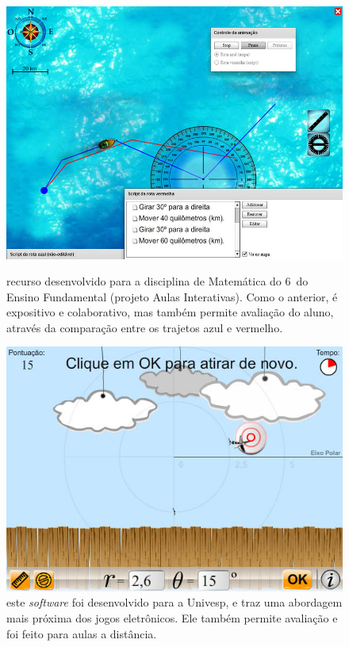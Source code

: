 \documentclass[a4paper,10pt]{scrartcl}					%
\newcommand\foreign[1]{\textsl{#1}}
\begin{document}
	\begin{figure}
		\centering
		\begin{minipage}[b]{0.46\textwidth}
			\includegraphics[width=\textwidth]{images/navigation.jpg}
			\caption{recurso desenvolvido para a disciplina de Matemática do 6\textordmasculine\ do Ensino Fundamental (projeto Aulas Interativas). Como o anterior, é expositivo e colaborativo, mas também permite avaliação do aluno, através da comparação entre os trajetos azul e vermelho.}
			\label{fig:nav}
		\end{minipage}\hfill
		\begin{minipage}[b]{0.46\textwidth}
			\includegraphics[width=\textwidth]{images/polar.jpg}
			\caption{este \foreign{software} foi desenvolvido para a Univesp, e traz uma abordagem mais próxima dos jogos eletrônicos. Ele também permite avaliação e foi feito para aulas a distância.}
			\label{fig:polar}
		\end{minipage}
	\end{figure}
	
\end{document}
